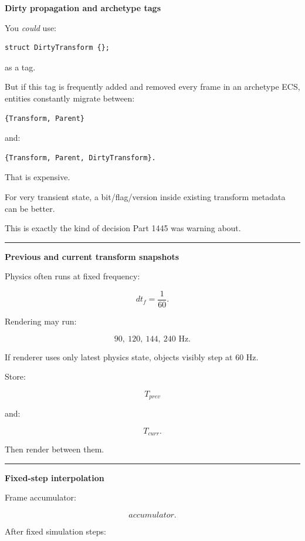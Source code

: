 \textbf{Dirty propagation and archetype tags}

You \emph{could} use:

\begin{verbatim}
struct DirtyTransform {};
\end{verbatim}

as a tag.

But if this tag is frequently added and removed every frame in an archetype ECS, entities constantly migrate between:

\begin{verbatim}
{Transform, Parent}
\end{verbatim}

and:

\begin{verbatim}
{Transform, Parent, DirtyTransform}.
\end{verbatim}

That is expensive.

For very transient state, a bit/flag/version inside existing transform metadata can be better.

This is exactly the kind of decision Part 1445 was warning about.

\begin{center}\rule{0.5\linewidth}{0.5pt}\end{center}

\textbf{Previous and current transform snapshots}

Physics often runs at fixed frequency:

\[
dt_f=\frac1{60}.
\]

Rendering may run:

\[
90,\ 120,\ 144,\ 240\text{ Hz}.
\]

If renderer uses only latest physics state, objects visibly step at 60 Hz.

Store:

\[
T_{prev}
\]

and:

\[
T_{curr}.
\]

Then render between them.

\begin{center}\rule{0.5\linewidth}{0.5pt}\end{center}

\textbf{Fixed-step interpolation}

Frame accumulator:

\[
accumulator.
\]

After fixed simulation steps:

